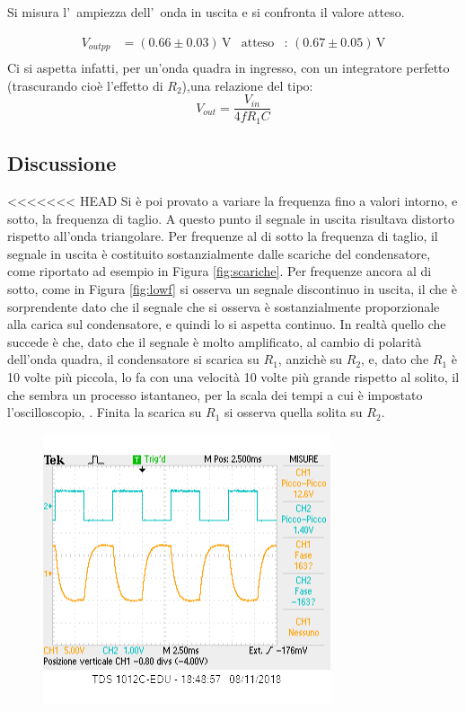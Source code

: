 \documentclass[10pt,a4paper]{article}
\begin{document}
\begin{table}[h]
	Si misura l'~ampiezza dell'~onda  in uscita e si confronta il valore atteso.
	
	\begin{align*}
	V_{out pp} &= (0.66\pm 0.03 )\,\mathrm{V} & \mathrm{atteso} &:\,(0.67\pm 0.05 )\, \mathrm{V}  \\
	\end{align*}
 	Ci si aspetta infatti, per un'onda quadra in ingresso, con un integratore perfetto (trascurando cioè l'effetto di $R_2$),una relazione del tipo: \[V_{out}=\frac{V_{in}}{4fR_{1}C}\]
	\clearpage
	\subsection{Discussione}
	
<<<<<<< HEAD
	Si è poi provato a variare la frequenza fino a valori intorno, e sotto, la frequenza di taglio. A questo punto il segnale in uscita risultava distorto rispetto all'onda triangolare. Per frequenze al di sotto la frequenza di taglio, il segnale in uscita è costituito sostanzialmente dalle scariche del condensatore, come riportato ad esempio in Figura \ref{fig:scariche}.
	Per frequenze ancora al di sotto, come in Figura \ref{fig:lowf} si osserva un segnale discontinuo in uscita, il che è sorprendente dato che il segnale che si osserva è sostanzialmente proporzionale alla carica sul condensatore, e quindi lo si aspetta continuo.  In realtà quello che succede è che, dato che il segnale è molto amplificato, al cambio di polarità dell'onda quadra, il condensatore si scarica su $R_1$, anzichè su $R_2$, e, dato che $R_1$ è 10 volte più piccola, lo fa con una velocità 10 volte più grande rispetto al solito, il che sembra un processo istantaneo, per la scala dei tempi a cui è impostato l'oscilloscopio, . Finita la scarica su $R_1$ si osserva quella solita su $R_2$. 
	\begin{figure}[h]

			\centering
			\includegraphics[scale=1]{scariche.png}


\end{figure}
\end{table}
\end{document}
